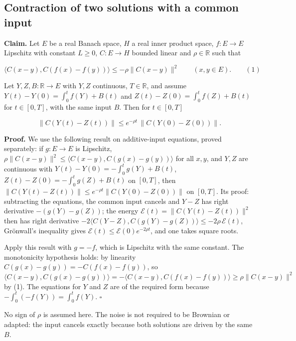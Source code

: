 \documentclass[11pt,a4paper]{report}
\begin{document}
\subsection{\texorpdfstring{Contraction of two solutions with a common input}{Contraction of two solutions with a common input}}


\textbf{Claim.} Let \(E\) be a real Banach space, \(H\) a real inner product space, \(f:E\to E\) Lipschitz with constant \(L\ge0\), \(C:E\to H\) bounded linear and \(\rho\in\mathbb R\) such that


\[\bigl\langle C(x-y),C(f(x)-f(y))\bigr\rangle\le-\rho\|C(x-y)\|^2\qquad(x,y\in E).\qquad(1)\]


Let \(Y,Z,B:\mathbb R\to E\) with \(Y,Z\) continuous, \(T\in\mathbb R\), and assume \(Y(t)-Y(0)=\int_0^tf(Y)+B(t)\) and \(Z(t)-Z(0)=\int_0^tf(Z)+B(t)\) for \(t\in[0,T]\), with the same input \(B\). Then for \(t\in[0,T]\)


\[\|C(Y(t)-Z(t))\|\le e^{-\rho t}\,\|C(Y(0)-Z(0))\| .\]


\textbf{Proof.} We use the following result on additive-input equations, proved separately: if \(g:E\to E\) is Lipschitz, \(\rho\|C(x-y)\|^2\le\langle C(x-y),C(g(x)-g(y))\rangle\) for all \(x,y\), and \(Y,Z\) are continuous with \(Y(t)-Y(0)=-\int_0^tg(Y)+B(t)\), \(Z(t)-Z(0)=-\int_0^tg(Z)+B(t)\) on \([0,T]\), then \(\|C(Y(t)-Z(t))\|\le e^{-\rho t}\|C(Y(0)-Z(0))\|\) on \([0,T]\). Its proof: subtracting the equations, the common input cancels and \(Y-Z\) has right derivative \(-(g(Y)-g(Z))\); the energy \(\mathcal E(t)=\|C(Y(t)-Z(t))\|^2\) then has right derivative \(-2\langle C(Y-Z),C(g(Y)-g(Z))\rangle\le-2\rho\,\mathcal E(t)\), Grönwall's inequality gives \(\mathcal E(t)\le\mathcal E(0)e^{-2\rho t}\), and one takes square roots.




Apply this result with \(g=-f\), which is Lipschitz with the same constant. The monotonicity hypothesis holds: by linearity \(C(g(x)-g(y))=-C(f(x)-f(y))\), so \(\langle C(x-y),C(g(x)-g(y))\rangle=-\langle C(x-y),C(f(x)-f(y))\rangle\ge\rho\|C(x-y)\|^2\) by (1). The equations for \(Y\) and \(Z\) are of the required form because \(-\int_0^t(-f(Y))=\int_0^tf(Y)\). \(\square\)




No sign of \(\rho\) is assumed here. The noise is not required to be Brownian or adapted: the input cancels exactly because both solutions are driven by the same \(B\).
\end{document}
